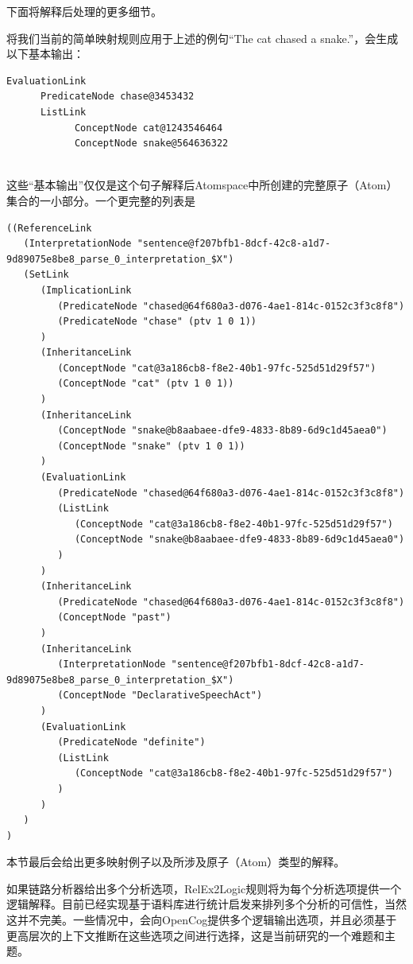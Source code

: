 下面将解释后处理的更多细节。

将我们当前的简单映射规则应用于上述的例句“The cat chased a snake.”，会生成以下基本输出：

 {\tt\begin{small}\begin{lstlisting}
EvaluationLink 
      PredicateNode chase@3453432
      ListLink
            ConceptNode cat@1243546464
            ConceptNode snake@564636322
       
\end{lstlisting}\end{small}}

这些“基本输出”仅仅是这个句子解释后Atomspace中所创建的完整原子（Atom）集合的一小部分。一个更完整的列表是

{\tt\begin{small}\begin{lstlisting}
((ReferenceLink
   (InterpretationNode "sentence@f207bfb1-8dcf-42c8-a1d7-9d89075e8be8_parse_0_interpretation_$X")
   (SetLink
      (ImplicationLink
         (PredicateNode "chased@64f680a3-d076-4ae1-814c-0152c3f3c8f8")
         (PredicateNode "chase" (ptv 1 0 1))
      )
      (InheritanceLink
         (ConceptNode "cat@3a186cb8-f8e2-40b1-97fc-525d51d29f57")
         (ConceptNode "cat" (ptv 1 0 1))
      )
      (InheritanceLink
         (ConceptNode "snake@b8aabaee-dfe9-4833-8b89-6d9c1d45aea0")
         (ConceptNode "snake" (ptv 1 0 1))
      )
      (EvaluationLink
         (PredicateNode "chased@64f680a3-d076-4ae1-814c-0152c3f3c8f8")
         (ListLink
            (ConceptNode "cat@3a186cb8-f8e2-40b1-97fc-525d51d29f57")
            (ConceptNode "snake@b8aabaee-dfe9-4833-8b89-6d9c1d45aea0")
         )
      )
      (InheritanceLink
         (PredicateNode "chased@64f680a3-d076-4ae1-814c-0152c3f3c8f8")
         (ConceptNode "past")
      )
      (InheritanceLink
         (InterpretationNode "sentence@f207bfb1-8dcf-42c8-a1d7-9d89075e8be8_parse_0_interpretation_$X")
         (ConceptNode "DeclarativeSpeechAct")
      )
      (EvaluationLink
         (PredicateNode "definite")
         (ListLink
            (ConceptNode "cat@3a186cb8-f8e2-40b1-97fc-525d51d29f57")
         )
      )
   )
)
\end{lstlisting}\end{small}}

本节最后会给出更多映射例子以及所涉及原子（Atom）类型的解释。

如果链路分析器给出多个分析选项，RelEx2Logic规则将为每个分析选项提供一个逻辑解释。目前已经实现基于语料库进行统计启发来排列多个分析的可信性，当然这并不完美。一些情况中，会向OpenCog提供多个逻辑输出选项，并且必须基于更高层次的上下文推断在这些选项之间进行选择，这是当前研究的一个难题和主题。


